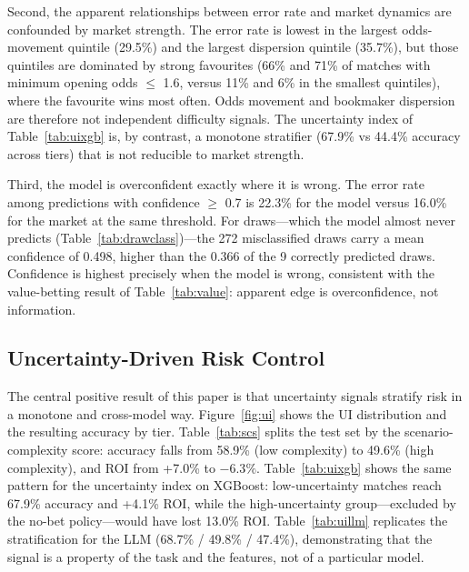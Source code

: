 Second, the apparent relationships between error rate and market
dynamics are confounded by market strength. The error rate is lowest
in the largest odds-movement quintile (29.5\%) and the largest
dispersion quintile (35.7\%), but those quintiles are dominated by
strong favourites (66\% and 71\% of matches with minimum opening odds
$\leq$ 1.6, versus 11\% and 6\% in the smallest quintiles), where the
favourite wins most often. Odds movement and bookmaker dispersion are
therefore not independent difficulty signals. The uncertainty index
of Table~\ref{tab:uixgb} is, by contrast, a monotone stratifier
(67.9\% vs 44.4\% accuracy across tiers) that is not reducible to
market strength.

Third, the model is overconfident exactly where it is wrong. The
error rate among predictions with confidence $\geq$ 0.7 is 22.3\%
for the model versus 16.0\% for the market at the same threshold.
For draws---which the model almost never predicts
(Table~\ref{tab:drawclass})---the 272 misclassified draws carry a
mean confidence of 0.498, higher than the 0.366 of the 9 correctly
predicted draws. Confidence is highest precisely when the model is
wrong, consistent with the value-betting result of
Table~\ref{tab:value}: apparent edge is overconfidence, not
information.

\subsection{Uncertainty-Driven Risk Control}




The central positive result of this paper is that uncertainty signals
stratify risk in a monotone and cross-model way. Figure~\ref{fig:ui}
shows the UI distribution and the resulting accuracy by tier.
Table~\ref{tab:scs}
splits the test set by the scenario-complexity score: accuracy falls
from 58.9\% (low complexity) to 49.6\% (high complexity), and ROI
from +7.0\% to $-6.3\%$. Table~\ref{tab:uixgb} shows the same
pattern for the uncertainty index on XGBoost: low-uncertainty matches
reach 67.9\% accuracy and +4.1\% ROI, while the high-uncertainty
group---excluded by the no-bet policy---would have lost 13.0\% ROI.
Table~\ref{tab:uillm} replicates the stratification for the LLM
(68.7\% / 49.8\% / 47.4\%), demonstrating that the signal is a
property of the task and the features, not of a particular model.

